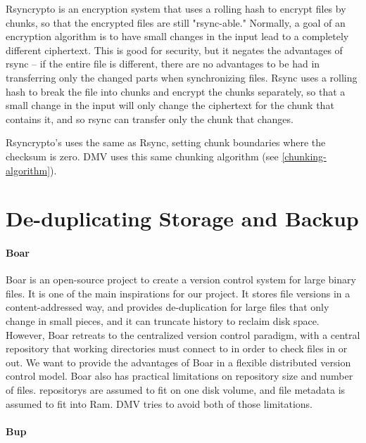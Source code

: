 Rsyncrypto\cite{rsyncrypto_algorithm} is an encryption system that uses a
rolling hash to encrypt files by chunks, so that the encrypted files are still
"rsync-able." Normally, a goal of an encryption algorithm is to have small
changes in the input lead to a completely different ciphertext. This is good for
security, but it negates the advantages of rsync -- if the entire file is
different, there are no advantages to be had in transferring only the changed
parts when synchronizing files. Rsync uses a rolling hash to break the file into
chunks and encrypt the chunks separately, so that a small change in the input
will only change the ciphertext for the chunk that contains it, and so rsync can
transfer only the chunk that changes.

Rsyncrypto's uses the same  as
Rsync\cite{rsyncrypto_algorithm,rsynctechreport}, setting chunk boundaries where
the checksum is zero. \gls{DMV} uses this same chunking algorithm (see
\autoref{chunking-algorithm}).


\section{De-duplicating Storage and Backup}

\paragraph{Boar}

Boar \cite{boar_homepage} is an open-source project to create a version control
system for large binary files. It is one of the main inspirations for our
project. It stores file versions in a content-addressed way, and provides
de-duplication for large files that only change in small pieces, and it can
truncate history to reclaim disk space. However, Boar retreats to the
centralized version control paradigm, with a central \gls{repository} that
working directories must connect to in order to check files in or out. We want
to provide the advantages of Boar in a flexible distributed version control
model. Boar also has practical limitations on \gls{repository} size and number
of files. \glspl{repository} are assumed to fit on one disk volume, and file
metadata is assumed to fit into Ram. \gls{DMV} tries to avoid both of those
limitations.


\paragraph{Bup}\label{related_bup}


